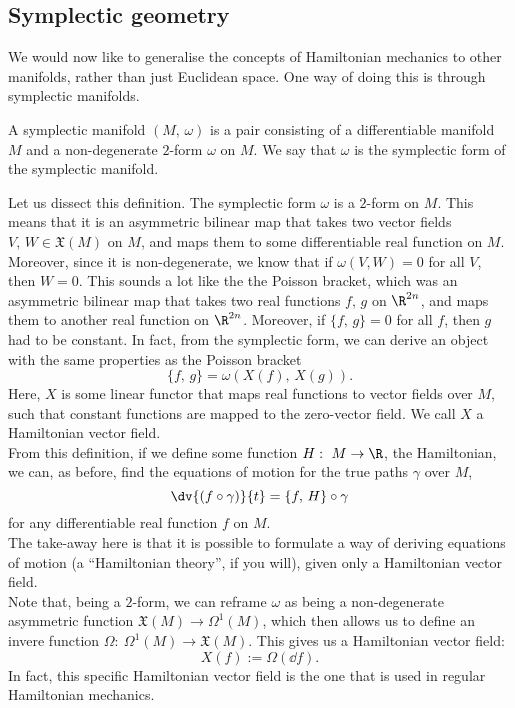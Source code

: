 \documentclass{article}
\begin{document}
\begin{multicols}{2}
	\section{Symplectic geometry}
	We would now like to generalise the concepts of Hamiltonian mechanics to other manifolds, rather than just Euclidean space. One way of doing this is through symplectic manifolds.
	\begin{definition}
		A symplectic manifold \((M,\,\omega)\) is a pair consisting of a differentiable manifold \(M\) and a non-degenerate \(2\)-form \(\omega\) on \(M\). We say that \(\omega\) is the symplectic form of the symplectic manifold.
	\end{definition}
	Let us dissect this definition. The symplectic form \(\omega\) is a \(2\)-form on \(M\). This means that it is an asymmetric bilinear map that takes two vector fields \(V,\,W\in\mathfrak{X}(M)\) on \(M\), and maps them to some differentiable real function on \(M\). Moreover, since it is non-degenerate, we know that if \(\omega(V,W) = 0\) for all \(V\), then \(W=0\).
	This sounds a lot like the the Poisson bracket, which was an asymmetric bilinear map that takes two real functions \(f,\,g\) on \(\R^{2n}\), and maps them to another real function on \(\R^{2n}\). Moreover, if \(\{f,\,g\}=0\) for all \(f\), then \(g\) had to be constant.
	In fact, from the symplectic form, we can derive an object with the same properties as the Poisson bracket
	\begin{equation}
		\{f,\,g\} = \omega(X(f),\,X(g)).
	\end{equation}
	Here, \(X\) is some linear functor that maps real functions to vector fields over \(M\), such that constant functions are mapped to the zero-vector field. We call \(X\) a Hamiltonian vector field.\\
	From this definition, if we define some function \(H:\ M\to\R\), the Hamiltonian, we can, as before, find the equations of motion for the true paths \(\gamma\) over \(M\),
	\begin{equation}
		\dv{(f\circ\gamma)}{t} = \{f,\,H\}\circ\gamma
	\end{equation}
	for any differentiable real function \(f\) on \(M\).\\
	The take-away here is that it is possible to formulate a way of deriving equations of motion (a ``Hamiltonian theory'', if you will), given only a Hamiltonian vector field.\\
	Note that, being a \(2\)-form, we can reframe \(\omega\) as being a non-degenerate asymmetric function \(\mathfrak{X}(M)\to \Omega^1(M)\), which then allows us to define an invere function \(\Omega:\ \Omega^1(M)\to\mathfrak{X}(M)\).
	This gives us a Hamiltonian vector field:
	\begin{equation}
		X(f) := \Omega(\dd f).
	\end{equation}
	In fact, this specific Hamiltonian vector field is the one that is used in regular Hamiltonian mechanics.

\end{multicols}
\end{document}

